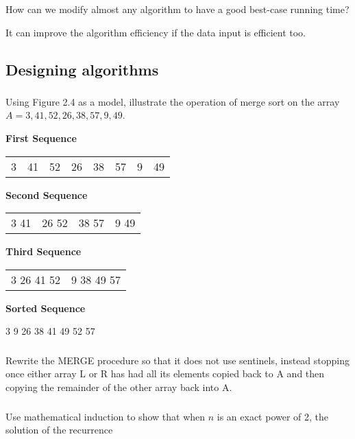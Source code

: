 \documentclass[a4paper,12pt]{article}
\begin{document}
    \subsubsection{} How can we modify almost any algorithm to
    have a good best-case running time?
    
    It can improve the algorithm efficiency if the data input
    is efficient too.
    
  \subsection{Designing algorithms}
     \subsubsection{} Using Figure 2.4 as a model, illustrate the
     operation of merge sort on the array
     $A = {3,41,52,26,38,57,9,49}$.
     
     \textbf{First Sequence}
      \begin{center}
	    \begin{tabular}{l l l l l l l l}
             3 & 41 & 52 & 26 & 38 & 57 & 9 & 49
            \end{tabular}
     \end{center}
     \textbf{Second Sequence}
     \begin {center}
	\begin{tabular}{l l l l}
	  3 41 & 26 52 & 38 57 & 9 49
	\end{tabular}
     \end {center}
     \textbf{Third Sequence}
     \begin{center}
      \begin{tabular}{l l}
       3 26 41 52 & 9 38 49 57
      \end{tabular}
     \end{center}
     \textbf{Sorted Sequence}
     \begin{center}
      3 9 26 38 41 49 52 57
     \end{center}
    \subsubsection{} Rewrite the MERGE procedure so that it does not
    use sentinels, instead stopping once either array L or R has had all its elements copied
    back to A and then copying the remainder of the other array back into A.
    
    
    \subsubsection{} Use mathematical induction to show that when $n$
    is an exact power of 2, the solution of the recurrence
    
\end{document}
